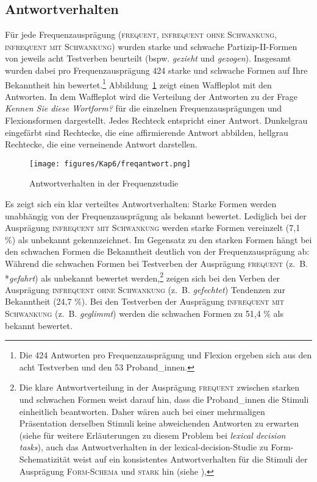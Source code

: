 \subsection{Antwortverhalten}\label{freqant}\largerpage

Für jede Frequenzausprägung (\textsc{frequent}, \textsc{infrequent ohne Schwankung}, \textsc{infrequent mit Schwankung}) wurden starke und schwache Partizip-II-Formen von jeweils acht Testverben beurteilt (bspw. \textit{gezieht} und \textit{gezogen}). Insgesamt wurden dabei pro Frequenzausprägung 424 starke und schwache Formen auf Ihre Bekanntheit hin bewertet.\footnote{Die 424 Antworten pro Frequenzausprägung und Flexion ergeben sich aus den acht Testverben und den 53 Proband\_innen.} Abbildung~\ref{freqantwortalle} zeigt einen Waffleplot mit den Antworten. In dem Waffleplot wird die Verteilung der Antworten zu der Frage \textit{Kennen Sie diese Wortform?} für die einzelnen Frequenzausprägungen und Flexionsformen dargestellt. Jedes Rechteck entspricht einer Antwort. Dunkelgrau eingefärbt sind Rechtecke, die eine affirmierende Antwort abbilden, hellgrau Rechtecke, die eine verneinende Antwort darstellen. 

\begin{figure}
\texttt{[image: figures/Kap6/freqantwort.png]} 
\caption{Antwortverhalten in der Frequenzstudie}
\label{freqantwortalle}
\end{figure}

Es zeigt sich ein klar verteiltes Antwortverhalten: Starke Formen werden unabhängig von der Frequenzausprägung als bekannt bewertet. Lediglich bei der Ausprägung \textsc{infrequent mit Schwankung} werden starke Formen vereinzelt (7,1 \%) als unbekannt gekennzeichnet. Im Gegensatz zu den starken Formen hängt bei den schwachen Formen die Bekanntheit deutlich von der Frequenzausprägung ab: Während die schwachen Formen bei Testverben der Ausprägung \textsc{frequent} (z.~B. *\textit{gefahrt}) als unbekannt bewertet werden,\footnote{Die klare Antwortverteilung in der Ausprägung \textsc{frequent} zwischen starken und schwachen Formen weist darauf hin, dass die Proband\_innen die Stimuli einheitlich beantworten. Daher wären auch bei einer mehrmaligen Präsentation derselben Stimuli keine abweichenden Antworten zu erwarten (siehe  für weitere Erläuterungen zu diesem Problem bei \textit{lexical decision tasks}), auch das Antwortverhalten in der lexical-decision-Studie zu Form-Schematizität weist auf ein konsistentes Antwortverhalten für die Stimuli der Ausprägung \textsc{Form-Schema} und \textsc{stark} hin (siehe ),} zeigen sich bei den Verben der Ausprägung \textsc{infrequent ohne Schwankung} (z.~B. \textit{gefechtet}) Tendenzen zur Bekanntheit (24,7 \%). Bei den Testverben der Ausprägung \textsc{infrequent mit Schwankung} (z.~B. \textit{geglimmt}) werden die schwachen Formen zu 51,4 \% als bekannt bewertet.

